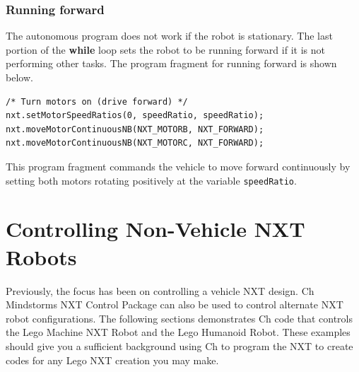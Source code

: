 \documentclass[11pt]{article}
\begin{document}
\subsubsection*{Running forward}
The autonomous program does not work if the robot is stationary. The last portion of the 
{\bf while} loop sets the robot to be running forward if it is not performing other tasks.
The program fragment for running forward is shown below.
\begin{lstlisting}
/* Turn motors on (drive forward) */
nxt.setMotorSpeedRatios(0, speedRatio, speedRatio);
nxt.moveMotorContinuousNB(NXT_MOTORB, NXT_FORWARD);
nxt.moveMotorContinuousNB(NXT_MOTORC, NXT_FORWARD);
\end{lstlisting}
This program fragment commands the vehicle to move forward continuously by setting both motors 
rotating positively at the variable {\tt speedRatio}.

\newpage
\section{Controlling Non-Vehicle NXT Robots}
Previously, the focus has been on controlling a vehicle NXT design. Ch Mindstorms NXT Control 
Package can also be used to control alternate NXT robot configurations. The following sections 
demonstrates Ch code that controls the Lego Machine NXT Robot and the Lego Humanoid Robot. These 
examples should give you a sufficient background using Ch to program the NXT to create codes 
for any Lego NXT creation you may make.
\end{document}
